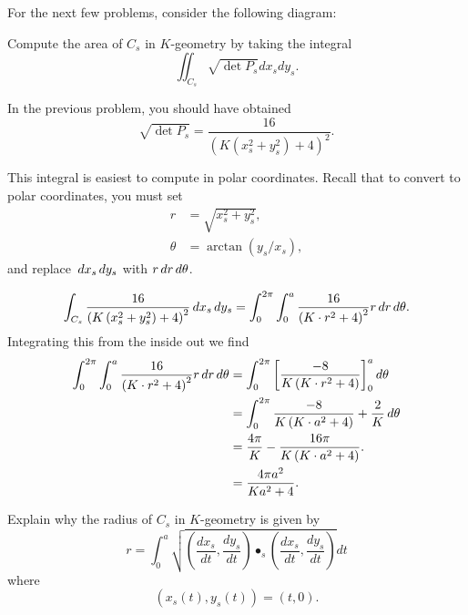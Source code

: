 \documentclass[newpage,hints,12pt,noauthor,nooutcomes]{ximera}
\begin{document}
For the next few problems, consider the following diagram:
\begin{center}
\end{center}


\begin{problem}
  Compute the area of $C_s$ in $K$-geometry by taking the integral
  \[\iint_{C_s} \sqrt{\det P_s}dx_sdy_s.\]
  \begin{hint}
    In the previous problem, you should have obtained
    \[\sqrt{\det P_s}=\frac{16}{(K(x_s^2+y_s^2)+4)^2}.\]
  \end{hint}
  \begin{hint}
    This integral is easiest to compute in polar coordinates.  Recall that to
    convert to polar coordinates, you must set
    \begin{align*}
      r &= \sqrt{x_s^2+y_s^2},\\
      \theta &= \arctan(y_s/x_s),
    \end{align*}
    and replace $\,d x_s\,d y_s$ with $r\,d r\,d \theta$.
  \end{hint}
  \begin{freeResponse}
    \[
    \int_{C_s} \frac{16}{\left(K\left(x_s^2+y_s^2\right)+4\right)^2} \,d x_s\,d y_s
    =\int_0^{2\pi}\int_0^a \frac{16}{\left(K\cdot r^2+4\right)^2} r\,d r \,d \theta.
    \]
    Integrating this from the inside out we find
    \begin{align*}
      \int_0^{2\pi} \int_0^a \frac{16}{\left(K\cdot r^2+4\right)^2} r\,d r \,d \theta
      &= \int_0^{2\pi} \bigg[ \frac{-8}{K\left(K\cdot r^2+4\right)} \bigg]_0^a \,d \theta\\
      &= \int_0^{2\pi} \frac{-8}{K\left(K\cdot a^2+4\right)}+\frac{2}{K} \,d \theta\\
      &= \frac{4\pi}{K}-\frac{16\pi}{K\left(K\cdot a^2+4\right)}. \\
      &= \frac{4\pi a^2}{Ka^2+4}.
    \end{align*}
  \end{freeResponse}
\end{problem}
\begin{problem}
  Explain why the radius of $C_s$ in $K$-geometry is given by
  \[r=\int_0^a \sqrt{\left(\frac{dx_s}{dt},\frac{dy_s}{dt}\right)
    \bullet_s \left(\frac{dx_s}{dt},\frac{dy_s}{dt}\right)}dt\]
  where
  \[(x_s(t),y_s(t))=(t,0).\]
\end{problem}
\end{document}
